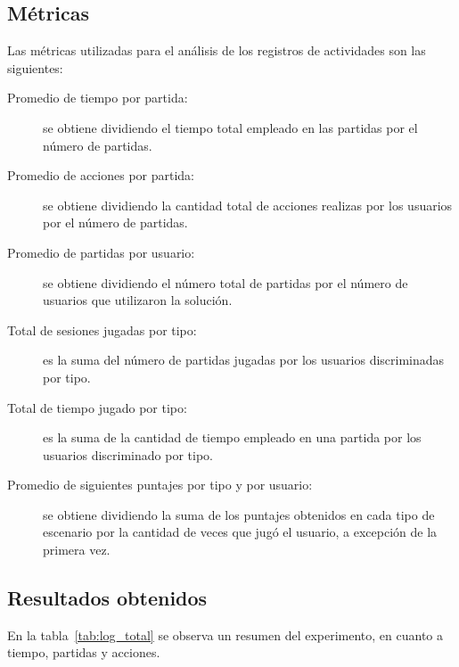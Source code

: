\subsection{Métricas}

Las métricas utilizadas para el análisis de los registros de actividades son las siguientes:

\begin{description}
\item[Promedio de tiempo por partida:] se obtiene dividiendo el tiempo total empleado 
    en las partidas por el número de partidas.
\item[Promedio de acciones por partida:] se obtiene dividiendo la cantidad total de 
    acciones realizas por los usuarios por el número de partidas.
\item[Promedio de partidas por usuario:] se obtiene dividiendo el número total de partidas
    por el número de usuarios que utilizaron la solución.
\item[Total de sesiones jugadas por tipo:] es la suma del número de partidas jugadas por los 
    usuarios discriminadas por tipo.
\item[Total de tiempo jugado por tipo:] es la suma de la cantidad de tiempo empleado en una 
    partida por los usuarios discriminado por tipo.
\item[Promedio de siguientes puntajes por tipo y por usuario:] se obtiene dividiendo la suma 
    de los puntajes obtenidos en cada tipo de escenario por la cantidad de veces que jugó el 
    usuario, a excepción de la primera vez.
\end{description}


\subsection{Resultados obtenidos}


En la tabla~\ref{tab:log_total} se observa un resumen del experimento, en cuanto
a tiempo, partidas y acciones.


